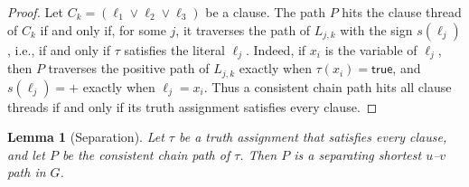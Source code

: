 \documentclass[a4paper,fleqn]{cas-sc}
\numberwithin{equation}{section}
\theoremstyle{definition}
\theoremstyle{plain}
\newtheorem{lemma}[definition]{Lemma}
\theoremstyle{remark}
\begin{document}
\begin{proof}
Let $C_k = (\ell_1 \vee \ell_2 \vee \ell_3)$ be a clause.
The path $P$ hits the clause thread of $C_k$ if and only if, for some $j$, it traverses the path of $L_{j,k}$ with the sign $s(\ell_j)$, i.e., if and only if $\tau$ satisfies the literal $\ell_j$.
Indeed, if $x_i$ is the variable of $\ell_j$, then $P$ traverses the positive path of $L_{j,k}$ exactly when $\tau(x_i)=\mathsf{true}$, and $s(\ell_j) = +$ exactly when $\ell_j = x_i$.
Thus a consistent chain path hits all clause threads if and only if its truth assignment satisfies every clause.
\end{proof}

\begin{lemma}[Separation]
\label{lem:separating}
Let $\tau$ be a truth assignment that satisfies every clause, and let $P$ be the consistent chain path of $\tau$.
Then $P$ is a separating shortest $u$--$v$ path in $G$.
\end{lemma}
\end{document}
